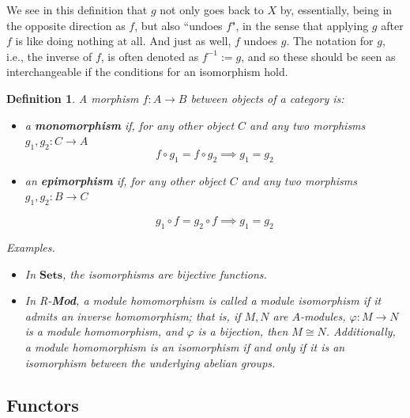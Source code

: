 \documentclass[12pt,reqno]{amsart}
\theoremstyle{plain}
\newtheorem{defi}{Definition}
\newcommand{\rmod}{\textit{R}-\textbf{Mod}}
\begin{document}
We see in this definition that $g$ not only goes back to $X$ by, essentially, being in the opposite direction as $f$, but also ``undoes $f$", in the sense that applying $g$ after $f$ is like doing nothing at all. And just as well, $f$ undoes $g$. The notation for $g$, i.e., the inverse of $f$, is often denoted as $f^{-1} := g$, and so these should be seen as interchangeable if the conditions for an isomorphism hold. 
\begin{defi} A morphism $f \colon A \to B$ between objects of a category is: 
\begin{itemize}
\item[$(1)$] a \textbf{monomorphism} if, for any other object $C$ and any two morphisms $g_1, g_2 \colon C \to A$
$$ f \circ g_1 = f \circ g_2 \implies g_1 = g_2 $$
\item[$(2)$] an \textbf{epimorphism} if, for any other object $C$ and any two morphisms $g_1, g_2 \colon B \to C$ 

$$ g_1 \circ f = g_2 \circ f \implies g_1 = g_2 $$
\end{itemize}

\textit{Examples.}

\begin{itemize} 

\item In $\mathbf{Sets}$, the isomorphisms are bijective functions. 

\item In \rmod, a module homomorphism is called a \textit{module isomorphism} if it admits an inverse homomorphism; that is, if $M, N$ are $A$-modules, $\varphi \colon M \to N$ is a module homomorphism, and $\varphi$ is a bijection, then $M \cong N$.  Additionally, a module homomorphism is an isomorphism if and only if it is an isomorphism between the underlying abelian groups. 

\end{itemize}
\end{defi}

\subsection{Functors}
\end{document}

